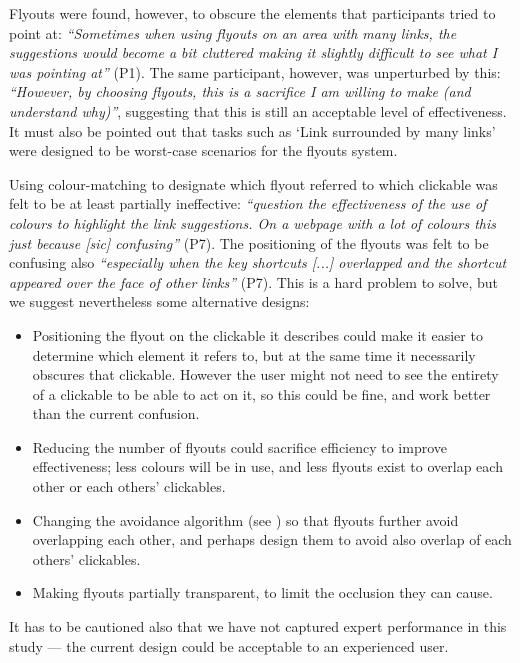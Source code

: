 \documentclass[11pt,openright,a4paper]{report}
\begin{document}
Flyouts were found, however, to obscure the elements that participants tried to point at: \textit{``Sometimes when using flyouts on an area with many links, the suggestions would become a bit cluttered making it slightly difficult to see what I was pointing at''} (P1). The same participant, however, was unperturbed by this: \textit{``However, by choosing flyouts, this is a sacrifice I am willing to make (and understand why)''}, suggesting that this is still an acceptable level of effectiveness. It must also be pointed out that tasks such as `Link surrounded by many links' were designed to be worst-case scenarios for the flyouts system.

Using colour-matching to designate which flyout referred to which clickable was felt to be at least partially ineffective: \textit{``question the effectiveness of the use of colours to highlight the link suggestions. On a webpage with a lot of colours this just because [sic] confusing''} (P7). The positioning of the flyouts was felt to be confusing also \textit{``especially when the key shortcuts [...] overlapped and the shortcut appeared over the face of other links''} (P7). This is a hard problem to solve, but we suggest nevertheless some alternative designs:

\begin{itemize}
\item Positioning the flyout on the clickable it describes could make it easier to determine which element it refers to, but at the same time it necessarily obscures that clickable. However the user might not need to see the entirety of a clickable to be able to act on it, so this could be fine, and work better than the current confusion.
\item Reducing the number of flyouts could sacrifice efficiency to improve effectiveness; less colours will be in use, and less flyouts exist to overlap each other or each others' clickables.
\item Changing the avoidance algorithm (see ) so that flyouts further avoid overlapping each other, and perhaps design them to avoid also overlap of each others' clickables.
\item Making flyouts partially transparent, to limit the occlusion they can cause.
\end{itemize}

It has to be cautioned also that we have not captured expert performance in this study --- the current design could be acceptable to an experienced user.
\end{document}
